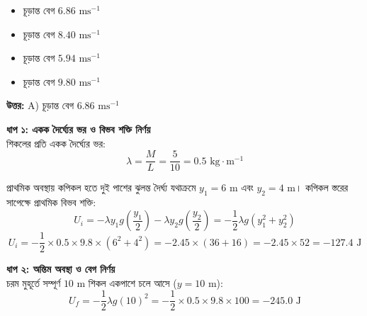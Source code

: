 \documentclass[12pt, a4paper]{article}
\begin{document}
{{\begin{center}
\end{center}
\vspace{1em}

\begin{itemize}[label={}, leftmargin=1cm, itemsep=0.5em]
    \item[\textbf{A)}] চূড়ান্ত বেগ $6.86\text{ ms}^{-1}$
    \item[\textbf{B)}] চূড়ান্ত বেগ $8.40\text{ ms}^{-1}$
    \item[\textbf{C)}] চূড়ান্ত বেগ $5.94\text{ ms}^{-1}$
    \item[\textbf{D)}] চূড়ান্ত বেগ $9.80\text{ ms}^{-1}$
\end{itemize}

\vspace{0.5em}
\begin{tcolorbox}[answerbox]
    \textbf{\color{success} উত্তর:} A) চূড়ান্ত বেগ $6.86\text{ ms}^{-1}$
\end{tcolorbox}
\vspace{1em}

\begin{tcolorbox}[solutionbox={সমাধান (Solution)}]
    \noindent
    \textbf{ধাপ ১: একক দৈর্ঘ্যের ভর ও বিভব শক্তি নির্ণয়} \\
    শিকলের প্রতি একক দৈর্ঘ্যের ভর:
    \[ \lambda = \frac{M}{L} = \frac{5}{10} = 0.5\text{ kg}\cdot\text{m}^{-1} \]
    
    প্রাথমিক অবস্থায় কপিকল হতে দুই পাশের ঝুলন্ত দৈর্ঘ্য যথাক্রমে $y_1 = 6\text{ m}$ এবং $y_2 = 4\text{ m}$। কপিকল স্তরের সাপেক্ষে প্রাথমিক বিভব শক্তি:
    \[ U_i = -\lambda y_1 g \left(\frac{y_1}{2}\right) - \lambda y_2 g \left(\frac{y_2}{2}\right) = -\frac{1}{2} \lambda g (y_1^2 + y_2^2) \]
    \[ U_i = -\frac{1}{2} \times 0.5 \times 9.8 \times (6^2 + 4^2) = -2.45 \times (36 + 16) = -2.45 \times 52 = -127.4\text{ J} \]
    
    \vspace{0.5em}
    \noindent\textbf{ধাপ ২: অন্তিম অবস্থা ও বেগ নির্ণয়} \\
    চরম মুহূর্তে সম্পূর্ণ $10\text{ m}$ শিকল একপাশে চলে আসে ($y = 10\text{ m}$):
    \[ U_f = -\frac{1}{2} \lambda g (10)^2 = -\frac{1}{2} \times 0.5 \times 9.8 \times 100 = -245.0\text{ J} \]
    

\end{tcolorbox}}}
\end{document}
